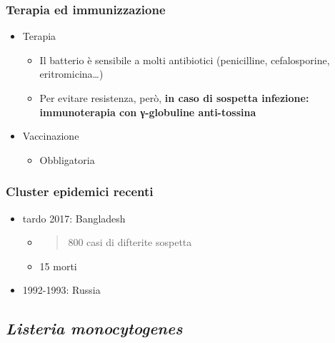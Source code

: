 \documentclass[italian,]{article}
\providecommand{\tightlist}{%
  \setlength{\itemsep}{0pt}\setlength{\parskip}{0pt}}
\begin{document}
\hypertarget{terapia-ed-immunizzazione}{%
\subsubsection{Terapia ed
immunizzazione}\label{terapia-ed-immunizzazione}}

\begin{itemize}
\tightlist
\item
  Terapia

  \begin{itemize}
  \tightlist
  \item
    Il batterio è sensibile a molti antibiotici (penicilline,
    cefalosporine, eritromicina\ldots{})
  \item
    Per evitare resistenza, però, \textbf{in caso di sospetta infezione:
    immunoterapia con γ-globuline anti-tossina}
  \end{itemize}
\item
  Vaccinazione

  \begin{itemize}
  \tightlist
  \item
    Obbligatoria
  \end{itemize}
\end{itemize}

\hypertarget{cluster-epidemici-recenti}{%
\subsubsection{Cluster epidemici
recenti}\label{cluster-epidemici-recenti}}

\begin{itemize}
\tightlist
\item
  tardo 2017: Bangladesh

  \begin{itemize}
  \item
    \begin{quote}
    800 casi di difterite sospetta
    \end{quote}
  \item
    15 morti
  \end{itemize}
\item
  1992-1993: Russia
\end{itemize}

\hypertarget{listeria-monocytogenes}{%
\subsection{\texorpdfstring{\emph{Listeria
monocytogenes}}{Listeria monocytogenes}}\label{listeria-monocytogenes}}
\end{document}
